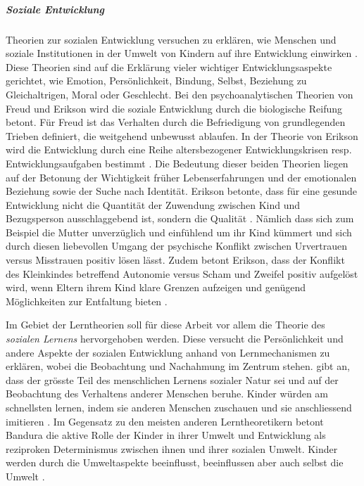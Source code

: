 \subparagraph{Soziale Entwicklung}\label{par:SozialeEntwicklung}
Theorien zur sozialen Entwicklung versuchen zu erklären, wie Menschen und soziale Institutionen in der Umwelt von Kindern auf ihre Entwicklung einwirken \cite[S.~470 ff.]{Siegler2008}. Diese Theorien sind auf die Erklärung vieler wichtiger Entwicklungsaspekte gerichtet, wie Emotion, Persönlichkeit, Bindung, Selbst, Beziehung zu Gleichaltrigen, Moral oder Geschlecht. Bei den psychoanalytischen Theorien von Freud und Erikson wird die soziale Entwicklung  durch die biologische Reifung betont. Für Freud ist das Verhalten durch die Befriedigung von grundlegenden Trieben definiert, die weitgehend unbewusst ablaufen. In der Theorie von Erikson wird die Entwicklung durch eine Reihe altersbezogener Entwicklungskrisen resp. Entwicklungsaufgaben bestimmt \cite[S.~472]{Siegler2008}. Die Bedeutung dieser beiden Theorien liegen auf der Betonung der Wichtigkeit früher Lebenserfahrungen und der emotionalen Beziehung sowie der Suche nach Identität. Erikson betonte, dass für eine gesunde Entwicklung nicht die Quantität der Zuwendung zwischen Kind und Bezugsperson ausschlaggebend ist, sondern die Qualität \cite[S.~243]{Berk2011}. Nämlich dass sich zum Beispiel die Mutter unverzüglich und einfühlend um ihr Kind kümmert und sich durch diesen liebevollen Umgang der psychische Konflikt zwischen Urvertrauen versus Misstrauen positiv lösen lässt. Zudem betont Erikson, dass der Konflikt des Kleinkindes betreffend Autonomie versus Scham und Zweifel positiv aufgelöst wird, wenn Eltern ihrem Kind klare Grenzen aufzeigen und genügend Möglichkeiten zur Entfaltung bieten \cite[S.~243]{Berk2011}. 

Im Gebiet der Lerntheorien soll für diese Arbeit vor allem die Theorie des \textit{sozialen Lernens} hervorgehoben werden. Diese versucht die Persönlichkeit und andere Aspekte der sozialen Entwicklung anhand von Lernmechanismen zu erklären, wobei die Beobachtung und Nachahmung im Zentrum stehen.  gibt an, dass der grösste Teil des menschlichen Lernens sozialer Natur sei und auf der Beobachtung des Verhaltens anderer Menschen beruhe. Kinder würden am schnellsten lernen, indem sie anderen Menschen zuschauen und sie anschliessend imitieren \cite[S.~482 ff.]{Siegler2008}. Im Gegensatz zu den meisten anderen Lerntheoretikern betont Bandura die aktive Rolle der Kinder in ihrer Umwelt und Entwicklung als reziproken Determinismus zwischen ihnen und ihrer sozialen Umwelt. Kinder werden durch die Umweltaspekte beeinflusst, beeinflussen aber auch selbst die Umwelt \cite[S.~482 ff.]{Siegler2008}. 

